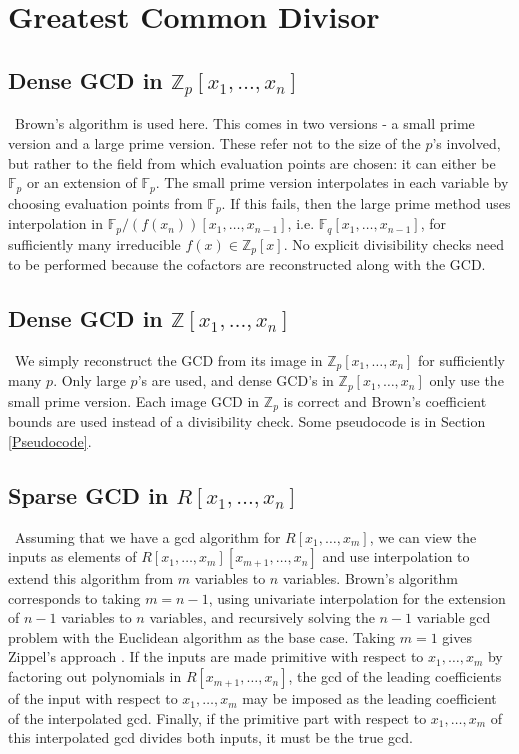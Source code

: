 \documentclass[11pt,reqno]{amsart}
\numberwithin{equation}{section}
\newcommand{\bbZ}[0]  { \mathbb{Z}}
\newcommand{\bbF}[0]  { \mathbb{F}}
\begin{document}
\section{Greatest Common Divisor}

\subsection{Dense GCD in $\bbZ_p[x_1,\dots,x_n]$}\
Brown's algorithm \cite{Brown} is used here. This comes in two versions - a
small prime version and a large prime version. These refer not to the size of
the $p$'s involved, but rather to the field from which evaluation points are
chosen: it can either be $\bbF_p$ or an extension of $\bbF_p$. The small prime
version interpolates in each variable by choosing evaluation points from
$\bbF_p$. If this fails, then the large prime method uses interpolation in
$\bbF_p/(f(x_n))[x_1,\dots,x_{n-1}]$, i.e. $\bbF_q[x_1,\dots,x_{n-1}]$, for
sufficiently many irreducible $f(x) \in \bbZ_p[x]$. No explicit divisibility
checks need to be performed because the cofactors are reconstructed along with
the GCD.

\subsection{Dense GCD in $\bbZ[x_1,\dots,x_n]$}\
We simply reconstruct the GCD from its image in $\bbZ_p[x_1,\dots,x_n]$ for
sufficiently many $p$. Only large $p$'s are used, and dense GCD's in
$\bbZ_p[x_1,\dots,x_n]$ only use the small prime version. Each image GCD in
$\bbZ_p$ is correct and Brown's coefficient bounds \cite{Brown} are used
instead of a divisibility check. Some pseudocode is in Section \ref{Pseudocode}.

\subsection{Sparse GCD in $R[x_1,\dots,x_n]$}\
Assuming that we have a gcd algorithm for $R[x_1,\dots,x_m]$, we can view the
inputs as elements of $R[x_1,\dots,x_m][x_{m+1},\dots,x_n]$ and use
interpolation to extend this algorithm from $m$ variables to $n$ variables.
Brown's algorithm corresponds to taking $m=n-1$, using univariate interpolation
for the extension of $n-1$ variables to $n$ variables, and recursively solving
the $n-1$ variable gcd problem with the Euclidean algorithm as the base case.
Taking $m=1$ gives Zippel's approach \cite{ZIPPEL}.
If the inputs are made primitive with respect to $x_1,\dots,x_m$ by factoring
out polynomials in $R[x_{m+1},\dots,x_n]$, the gcd of the leading coefficients
of the input with respect to $x_1,\dots,x_m$ may be imposed as the leading
coefficient of the interpolated gcd. Finally, if the primitive part with
respect to $x_1,\dots,x_m$ of this interpolated gcd divides both inputs, it
must be the true gcd.
\end{document}
